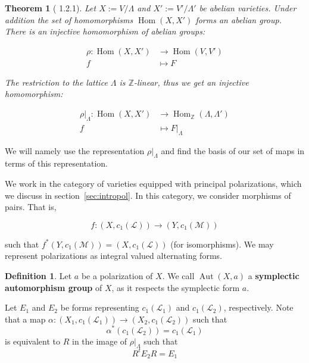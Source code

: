 \documentclass[12pt,reqno]{amsart}
\DeclareMathOperator{\Aut}{Aut}
\DeclareMathOperator{\Hom}{Hom}
\newcommand{\Z}{\mathbb{Z}}
\newcommand{\mc}{\mathcal}
\newtheorem*{thm*}{Theorem}
\theoremstyle{definition}
\newtheorem{defn}{Definition}
\theoremstyle{remark}
\begin{document}
\begin{thm*}[\cite{bl} 1.2.1] Let $X:= V/\Lambda$ and $X':= V'/\Lambda'$ be abelian varieties. Under addition the set of homomorphisms $\Hom(X, X')$ forms an abelian group. There is an injective homomorphism of abelian groups: 


\begin{align*} 
\rho: \Hom(X, X') &\to \Hom(V, V') \\
f &\mapsto F
\end{align*} 

The restriction to the lattice $\Lambda$ is $\Z$-linear, thus we get an injective homomorphism: 


\begin{align*} 
\rho|_{\Lambda}: \Hom(X, X') &\to \Hom_{\Z}(\Lambda, \Lambda') \\
f &\mapsto F|_{\Lambda}
\end{align*} 


\end{thm*}

We will namely use the representation $\rho|_{\Lambda}$ and find the basis of our set of maps in terms of this representation. 

We work in the category of varieties equipped with principal polarizations, which we discuss in section~\ref{sec:intropol}. In this category, we consider morphisms of pairs. That is,

$$f: (X, c_1(\mc{L})) \to (Y, c_1(\mc{M}))$$

such that $f^*(Y, c_1(\mc{M})) = (X, c_1(\mc{L}))$ (for isomorphisms).  We may represent polarizations as integral valued alternating forms. 



\begin{defn} Let $a$ be a polarization of $X$. We call $\Aut(X, a)$ a \textbf{symplectic automorphism group} of $X$, as it respects the symplectic form $a$. 
\end{defn}


Let $E_1$ and $E_2$ be forms representing $c_1(\mc{L}_1)$ and $c_1(\mc{L}_2)$, respectively. Note that a map $\alpha: (X_1, c_1(\mc{L}_1)) \to (X_2, c_1(\mc{L}_2))$ such that $$\alpha^*(c_1(\mc{L}_2)) = c_1(\mc{L}_1)$$ is equivalent to $R$ in the image of $\rho|_{\Lambda}$ such that $$R^tE_2R = E_1$$
\end{document}
